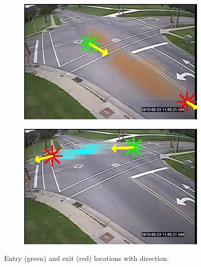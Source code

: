 \begin{figure}
        \begin{subfigure}{0.32\linewidth}
            \includegraphics[width=\linewidth]{./img/scene_learning/res/244458/244458-2.jpg}
        \end{subfigure}
        \begin{subfigure}{0.32\linewidth}
            \includegraphics[width=\linewidth]{./img/scene_learning/res/244458/244458-3.jpg}
        \end{subfigure}
        \caption{Entry (green) and exit (red) locations with direction.}
        \label{fig:entry-exit-full-1}
\end{figure}

